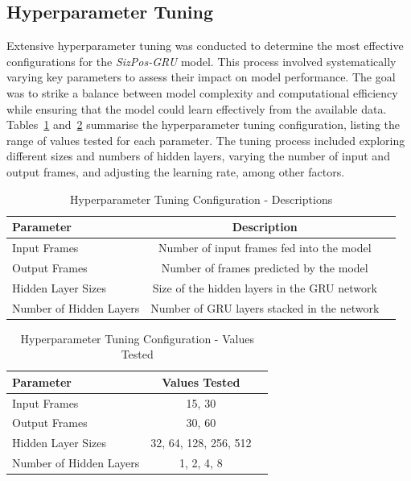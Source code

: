 \documentclass[12pt,oneside]{book} %
\begin{document}
\newpage
\subsection*{Hyperparameter Tuning}
\noindent Extensive hyperparameter tuning was conducted to determine the most effective
configurations for the \textit{SizPos-GRU} model. This process involved systematically
varying key parameters to assess their impact on model performance. The goal
was to strike a balance between model complexity and computational efficiency
while ensuring that the model could learn effectively from the available data.
Tables~\ref{tab:hp_tuning_descriptions} and~\ref{tab:hp_tuning_values} summarise the hyperparameter tuning configuration,
listing the range of values tested for each parameter. The tuning process
included exploring different sizes and numbers of hidden layers, varying the
number of input and output frames, and adjusting the learning rate, among other
factors.

\begin{table}[H]
    \centering
    \caption{Hyperparameter Tuning Configuration - Descriptions}
    \label{tab:hp_tuning_descriptions}
    \begin{adjustbox}{max width=\textwidth}
        \begin{tabular}{lcc}
            \toprule
            \textbf{Parameter}      & \textbf{Description}                         \\ 
            \midrule
            Input Frames            & Number of input frames fed into the model    \\ 
            Output Frames           & Number of frames predicted by the model      \\ 
            Hidden Layer Sizes      & Size of the hidden layers in the GRU network \\ 
            Number of Hidden Layers & Number of GRU layers stacked in the network  \\ 
            \bottomrule
        \end{tabular}
    \end{adjustbox}
\end{table}

\begin{table}[H]
    \centering
    \caption{Hyperparameter Tuning Configuration - Values Tested}
    \label{tab:hp_tuning_values}
    \begin{adjustbox}{max width=\textwidth}
        \begin{tabular}{lcc}
            \toprule
            \textbf{Parameter}      & \textbf{Values Tested} \\ 
            \midrule
            Input Frames            & 15, 30                 \\ 
            Output Frames           & 30, 60                 \\ 
            Hidden Layer Sizes      & 32, 64, 128, 256, 512  \\ 
            Number of Hidden Layers & 1, 2, 4, 8             \\ 
            \bottomrule
        \end{tabular}
    \end{adjustbox}
\end{table}
\end{document}
